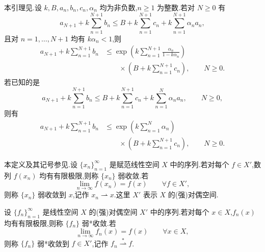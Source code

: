 \begin{lemma}[离散 Gronwall 引理]\label{lem:appendix-a-56}\label{lem:appendix-a-43}\label{lem:appendix-a-45}
本引理见\textcite[引理 5.1]{HeywoodRannacher1990}.设 $k,B,a_n,b_n,c_n,\alpha_n$ 均为非负数,$n\ge1$ 为整数.若对 $N\ge0$ 有
\begin{equation}\label{eq:appendix-a-42}
 a_{N+1}+k\sum_{n=1}^{N+1}b_n
 \le B+k\sum_{n=1}^{N+1}c_n+k\sum_{n=1}^{N+1}\alpha_n a_n,
\end{equation}
且对 $n=1,\ldots,N+1$ 均有 $k\alpha_n<1$,则
\begin{equation}\label{eq:appendix-a-43}
 \begin{split}
 a_{N+1}+k\sum_{n=1}^{N+1}b_n
 &\le \exp\left(k\sum_{n=1}^{N+1}\frac{\alpha_n}{1-k\alpha_n}\right)\\
 &\qquad\times\left(B+k\sum_{n=1}^{N+1}c_n\right),
 \qquad N\ge0.
 \end{split}
\end{equation}
若已知的是
\begin{equation}\label{eq:appendix-a-44}
 a_{N+1}+k\sum_{n=1}^{N+1}b_n
 \le B+k\sum_{n=1}^{N+1}c_n+k\sum_{n=1}^{N}\alpha_n a_n,
 \qquad N\ge0,
\end{equation}
则有
\begin{equation}\label{eq:appendix-a-45}
 \begin{split}
 a_{N+1}+k\sum_{n=1}^{N+1}b_n
 &\le \exp\left(k\sum_{n=1}^{N}\alpha_n\right)\\
 &\qquad\times\left(B+k\sum_{n=1}^{N+1}c_n\right),
 \qquad N\ge0.
 \end{split}
\end{equation}
\end{lemma}

\begin{definition}[弱收敛与弱*收敛]\label{def:appendix-a-57}
本定义及其记号参见\textcite[第 120、125 页]{Yosida1995}.设 $\{x_n\}_{n=1}^{\infty}$ 是赋范线性空间 $X$ 中的序列.若对每个 $f\in X'$,数列 $f(x_n)$ 均有有限极限,则称 $\{x_n\}$ 弱收敛.若
\[
 \lim_{n\to\infty}f(x_n)=f(x)\qquad\forall f\in X',
\]
则称 $\{x_n\}$ 弱收敛到 $x$,记作 $x_n\rightharpoonup x$.这里 $X'$ 表示 $X$ 的(强)对偶空间.

设 $\{f_n\}_{n=1}^{\infty}$ 是线性空间 $X$ 的(强)对偶空间 $X'$ 中的序列.若对每个 $x\in X$,$f_n(x)$ 均有有限极限,则称 $\{f_n\}$ 弱*收敛.若
\[
 \lim_{n\to\infty}f_n(x)=f(x)\qquad\forall x\in X,
\]
则称 $\{f_n\}$ 弱*收敛到 $f\in X'$,记作 $f_n\stackrel{*}{\rightharpoonup}f$.
\end{definition}

